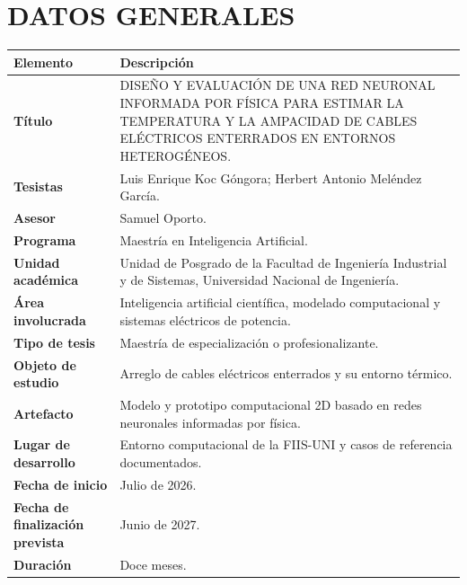 \documentclass[11pt,a4paper,oneside]{report}
\newcommand{\tituloTesis}{DISEÑO Y EVALUACIÓN DE UNA RED NEURONAL INFORMADA POR FÍSICA PARA ESTIMAR LA TEMPERATURA Y LA AMPACIDAD DE CABLES ELÉCTRICOS ENTERRADOS EN ENTORNOS HETEROGÉNEOS}
\begin{document}
\chapter*{DATOS GENERALES}
\begin{tabularx}{\textwidth}{>{\bfseries\RaggedRight\arraybackslash}p{4.1cm}J}
\toprule
{}
Elemento & Descripción \\
\midrule
Título & \tituloTesis. \\
Tesistas & Luis Enrique Koc Góngora; Herbert Antonio Meléndez García. \\
Asesor & Samuel Oporto. \\
Programa & Maestría en Inteligencia Artificial. \\
Unidad académica & Unidad de Posgrado de la Facultad de Ingeniería Industrial y de Sistemas, Universidad Nacional de Ingeniería. \\
Área involucrada & Inteligencia artificial científica, modelado computacional y sistemas eléctricos de potencia. \\
Tipo de tesis & Maestría de especialización o profesionalizante. \\
Objeto de estudio & Arreglo de cables eléctricos enterrados y su entorno térmico. \\
Artefacto & Modelo y prototipo computacional 2D basado en redes neuronales informadas por física. \\
Lugar de desarrollo & Entorno computacional de la FIIS-UNI y casos de referencia documentados. \\
Fecha de inicio & Julio de 2026. \\
Fecha de finalización prevista & Junio de 2027. \\
Duración & Doce meses. \\
\bottomrule
\end{tabularx}





\begingroup
\singlespacing
\tableofcontents
\listoffigures
\listoftables
\listofformulas
\endgroup



\clearpage
{}


\clearpage





\clearpage
\begin{singlespace}
\printbibliography[heading=bibintoc,title={REFERENCIAS}]
\end{singlespace}


\end{document}
